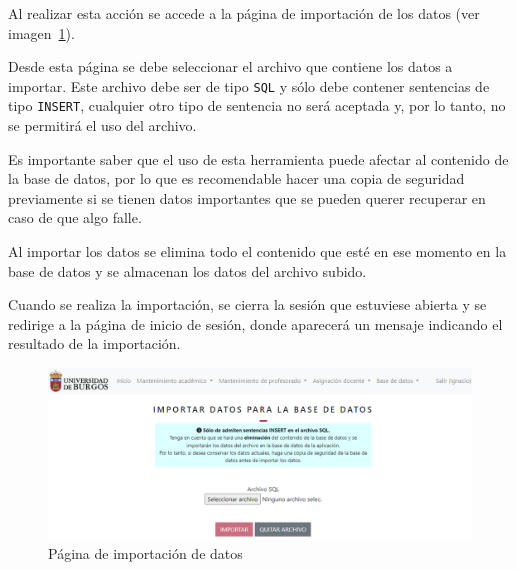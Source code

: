 Al realizar esta acción se accede a la página de importación de los datos (ver imagen~\ref{pag:importar}).

Desde esta página se debe seleccionar el archivo que contiene los datos a importar.
Este archivo debe ser de tipo \texttt{SQL} y sólo debe contener sentencias de tipo \texttt{INSERT}, cualquier otro tipo de sentencia no será aceptada y, por lo tanto, no se permitirá el uso del archivo.

Es importante saber que el uso de esta herramienta puede afectar al contenido de la base de datos, por lo que es recomendable hacer una copia de seguridad previamente si se tienen datos importantes que se pueden querer recuperar en caso de que algo falle.

Al importar los datos se elimina todo el contenido que esté en ese momento en la base de datos y se almacenan los datos del archivo subido.

Cuando se realiza la importación, se cierra la sesión que estuviese abierta y se redirige a la página de inicio de sesión, donde aparecerá un mensaje indicando el resultado de la importación.

\begin{figure}
	\centering
	\includegraphics[width=\textwidth]{../img/Anexos/Manual usuario/importar.png}
	\caption{Página de importación de datos}\label{pag:importar}
\end{figure}

